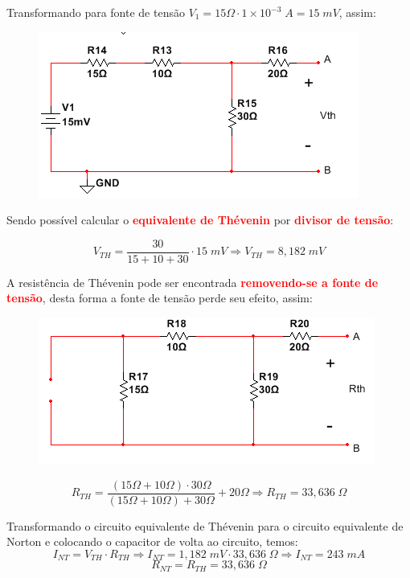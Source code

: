 \documentclass[
	12pt,				%
	oneside,			%
	a4paper,			%
	english,			%
	french,				%
	spanish,			%
	brazil				%
	]{abntex2}
\begin{document}
\newpage

Transformando para fonte de tensão $V_1 = 15 \Omega \cdot 1 \times 10^{-3}\;A = 15 \; mV$, assim:

\begin{figure}[htb]
	\centering
	\includegraphics[scale=0.8]{Circuito_2-19(d).PNG}
\end{figure}

Sendo possível calcular o \textbf{\textcolor{red}{equivalente de Thévenin}} por \textbf{\textcolor{red}{divisor de tensão}}:

$$V_{TH} = \dfrac{30}{15+10+30} \cdot 15 \;mV \Longrightarrow V_{TH} = 8,182 \; mV$$ 

A resistência de Thévenin pode ser encontrada \textbf{\textcolor{red}{removendo-se a fonte de tensão}}, desta forma a fonte de tensão perde seu efeito, assim:

\begin{figure}[htb]
	\centering
	\includegraphics[scale=0.75]{Circuito_2-19(e).PNG}
\end{figure}

$$R_{TH} = \dfrac{(15\Omega+10\Omega) \cdot 30\Omega}{(15\Omega+10\Omega) + 30\Omega} + 20 \Omega \Longrightarrow R_{TH} = 33,636 \; \Omega$$

Transformando o circuito equivalente de Thévenin para o circuito equivalente de Norton e colocando o capacitor de volta ao circuito, temos:
$$I_{NT} = V_{TH} \cdot R_{TH} \Longrightarrow I_{NT} = 1,182\;mV \cdot 33,636\;\Omega \Longrightarrow I_{NT} = 243\;mA$$
$$R_{NT}=R_{TH}=33,636\;\Omega$$
\end{document}
